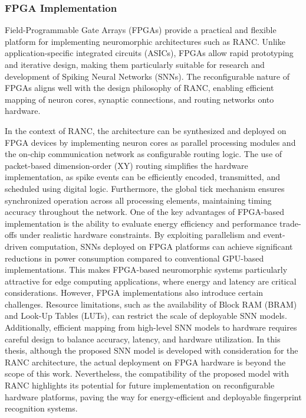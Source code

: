\documentclass[../main.tex]{subfiles}
\begin{document}
\subsubsection{FPGA Implementation}
Field-Programmable Gate Arrays (FPGAs) provide a practical and flexible platform for implementing neuromorphic architectures such as RANC. Unlike application-specific integrated circuits (ASICs), FPGAs allow rapid prototyping and iterative design, making them particularly suitable for research and development of Spiking Neural Networks (SNNs). The reconfigurable nature of FPGAs aligns well with the design philosophy of RANC, enabling efficient mapping of neuron cores, synaptic connections, and routing networks onto hardware.

In the context of RANC, the architecture can be synthesized and deployed on FPGA devices by implementing neuron cores as parallel processing modules and the on-chip communication network as configurable routing logic. The use of packet-based dimension-order (XY) routing simplifies the hardware implementation, as spike events can be efficiently encoded, transmitted, and scheduled using digital logic. Furthermore, the global tick mechanism ensures synchronized operation across all processing elements, maintaining timing accuracy throughout the network. 
One of the key advantages of FPGA-based implementation is the ability to evaluate energy efficiency and performance trade-offs under realistic hardware constraints. By exploiting parallelism and event-driven computation, SNNs deployed on FPGA platforms can achieve significant reductions in power consumption compared to conventional GPU-based implementations. This makes FPGA-based neuromorphic systems particularly attractive for edge computing applications, where energy and latency are critical considerations.
However, FPGA implementations also introduce certain challenges. Resource limitations, such as the availability of Block RAM (BRAM) and Look-Up Tables (LUTs), can restrict the scale of deployable SNN models. Additionally, efficient mapping from high-level SNN models to hardware requires careful design to balance accuracy, latency, and hardware utilization.
In this thesis, although the proposed SNN model is developed with consideration for the RANC\cite{RANC} architecture, the actual deployment on FPGA hardware is beyond the scope of this work. Nevertheless, the compatibility of the proposed model with RANC\cite{RANC} highlights its potential for future implementation on reconfigurable hardware platforms, paving the way for energy-efficient and deployable fingerprint recognition systems.
\end{document}
